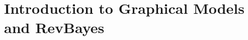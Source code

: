 \documentclass[11pt]{article}
\begin{document}
%
%
%
%

\section{Introduction to Graphical Models and RevBayes}
\end{document}
